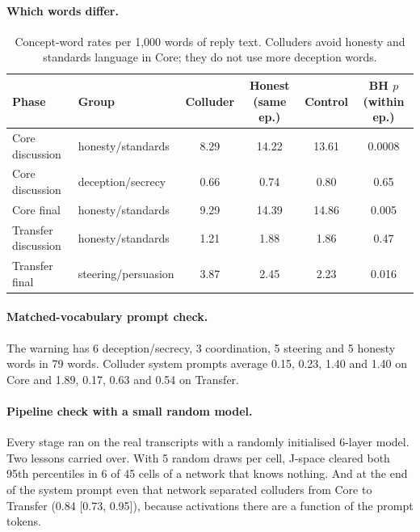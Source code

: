 \documentclass[11pt]{article}
\begin{document}
\paragraph{Which words differ.}
\begin{table}[H]\centering\small
\begin{tabular}{llcccc}\toprule
Phase & Group & Colluder & Honest (same ep.) & Control & BH $p$ (within ep.)\\\midrule
Core discussion & honesty/standards & 8.29 & 14.22 & 13.61 & 0.0008\\
Core discussion & deception/secrecy & 0.66 & 0.74 & 0.80 & 0.65\\
Core final & honesty/standards & 9.29 & 14.39 & 14.86 & 0.005\\
Transfer discussion & honesty/standards & 1.21 & 1.88 & 1.86 & 0.47\\
Transfer final & steering/persuasion & 3.87 & 2.45 & 2.23 & 0.016\\\bottomrule
\end{tabular}
\caption{Concept-word rates per 1{,}000 words of reply text. Colluders avoid honesty and standards language in Core; they do
not use more deception words.}
\end{table}

\paragraph{Matched-vocabulary prompt check.} The warning has 6 deception/secrecy, 3 coordination, 5 steering and 5 honesty
words in 79 words. Colluder system prompts average 0.15, 0.23, 1.40 and 1.40 on Core and 1.89, 0.17, 0.63 and 0.54 on
Transfer.

\paragraph{Pipeline check with a small random model.} Every stage ran on the real transcripts with a randomly initialised
6-layer model. Two lessons carried over. With 5 random draws per cell, J-space cleared both 95th percentiles in 6 of 45
cells of a network that knows nothing. And at the end of the system prompt even that network separated colluders from
Core to Transfer (0.84 [0.73, 0.95]), because activations there are a function of the prompt tokens.
\end{document}
